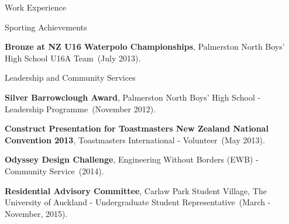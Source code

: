 \documentclass[11pt]{tracv}
\begin{document}
\begin{columnsection}{Work Experience}

	

\end{columnsection}

%
%

\pagebreak

\begin{hangingsection}{Sporting Achievements}

		\hangingentry \textbf{Bronze at NZ U16 Waterpolo Championships}, Palmerston North Boys' High School U16A Team~(July 2013).

\end{hangingsection}

\begin{hangingsection}{Leadership and Community Services}

    \hangingentry \textbf{Silver Barrowclough Award}, Palmerston North Boys' High School - Leadership Programme~(November 2012).

    \hangingentry \textbf{Construct Presentation for Toastmasters New Zealand National Convention 2013}, Toastmasters International - Volunteer~(May 2013).

    \hangingentry \textbf{Odyssey Design Challenge}, Engineering Without Borders (EWB) - Community Service~(2014).

    \hangingentry \textbf{Residential Advisory Committee}, Carlaw Park Student Village, The University of Auckland - Undergraduate Student Representative~(March - November, 2015).

\end{hangingsection}
\end{document}
